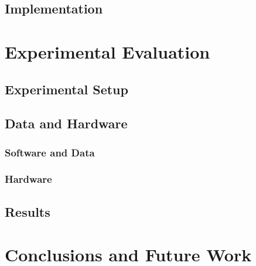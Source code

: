 
\subsection{Implementation}
\label{subsec:implementation}
%
%



\section{Experimental Evaluation}
\label{sec:evaluation}
%
%
\subsection{Experimental Setup}
\label{subsec:exp_setup}

\subsection{Data and Hardware}
\label{subsec:hardware}

\subsubsection{Software and Data}
\label{subsubsec:software}

\subsubsection{Hardware}
\label{subsubsec:hardware}

\subsection{Results}
\label{subsec:results}

\section{Conclusions and Future Work}
\label{sec:discussion_conclusion}

